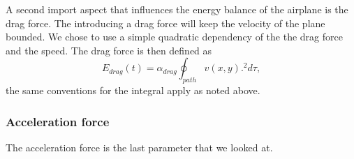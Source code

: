A second import aspect that influences the energy balance of the airplane is the drag force.
The introducing a drag force will keep the velocity of the plane bounded.
We chose to use a simple quadratic dependency of the the drag force and the speed.
The drag force is then defined as 
\begin{equation}
E_{drag}(t)  =  \alpha_{drag} \oint_{path} v(x,y).^2  d \tau,
\end{equation}
the same conventions for the integral apply as noted above.


\subsubsection{Acceleration force}

The acceleration force is the last parameter that we looked at.





